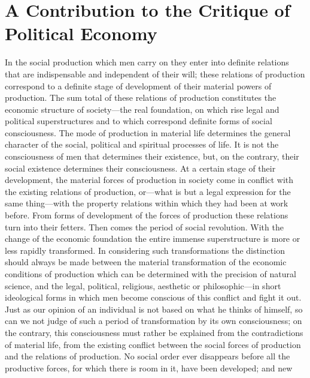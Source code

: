 
\lchapsep{8ex}
\author{Karl Marx}
\chapter[A Contribution to the Critique of Political Economy,
excerpt]{A Contribution to the Critique of Political Economy}
\restorechapsep

In the social production which men carry on they enter into
definite relations that are indispensable and independent of their
will; these relations of production correspond to a definite stage of
development of their material powers of production. The sum total of
these relations of production constitutes the economic structure of
society---the real foundation, on which rise legal and political
superstructures and to which correspond definite forms of social
consciousness. The mode of production in material life determines the
general character of the social, political and spiritual processes of
life. It is not the consciousness of men that determines their
existence, but, on the contrary, their social existence determines
 their consciousness. At a certain stage of their
development, the material forces of production in society come in
conflict with the existing relations of production, or---what is but a
legal expression for the same thing---with the property relations
within which they had been at work before. From forms of development
of the forces of production these relations turn into their fetters.
Then comes the period of social revolution. With the change of the
economic foundation the entire immense superstructure is more or less
rapidly transformed. In considering such transformations the
distinction should always be made between the material transformation
of the economic conditions of production which can be determined with
the precision of natural science, and the legal, political, religious,
aesthetic or philosophic---in short ideological forms in which men
become conscious of this conflict and fight it out. Just as our
opinion of an individual is not based on what he thinks of himself, so
can we not judge of such a period of transformation by its own
consciousness; on the contrary, this consciousness must rather be
explained from the contradictions of material life, from the existing
conflict between the social forces of production and the relations of
production. No social order ever disappears before all the productive
forces, for which there is room in it, have been developed; and new
